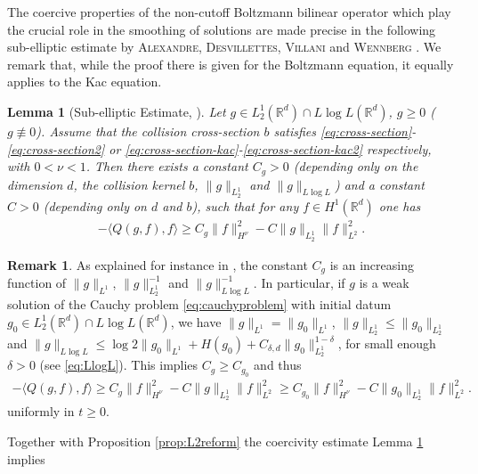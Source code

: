 \documentclass[11pt,a4paper,reqno]{amsart}
\theoremstyle{plain}
\newtheorem{lemma}[proposition]{Lemma}
\theoremstyle{definition}
\newtheorem{remark}[proposition]{Remark}
\begin{document}
The coercive properties of the non-cutoff Boltzmann bilinear operator which play the crucial role in the smoothing of solutions are made precise in the following sub-elliptic estimate by \textsc{Alexandre, Desvillettes, Villani} and \textsc{Wennberg} \cite{ADVW00}. We remark that, while the proof there is given for the Boltzmann equation, it equally applies to the Kac equation.

\begin{lemma}[Sub-elliptic Estimate, \cite{ADVW00}]\label{lem:subelliptic}
	Let $g\in L^1_2({\mathbb{R}}^d) \cap L\log L({\mathbb{R}}^d)$, $g\geq 0$ ($g\not\equiv 0$). Assume that the collision cross-section $b$ satisfies \eqref{eq:cross-section}-\eqref{eq:cross-section2} or \eqref{eq:cross-section-kac}-\eqref{eq:cross-section-kac2} respectively, with $0<\nu<1$. Then there exists a constant $C_g>0$ (depending only on the dimension $d$, the collision kernel $b$, $\|g\|_{L^1_2}$ and $\|g\|_{L\log L}$) and a constant $C>0$ (depending only on $d$ and $b$), such that for any $f\in H^1({\mathbb{R}}^d)$ one has
	\begin{align*}
		-\langle Q(g,f), f\rangle \geq C_g \|f\|_{H^{\nu}}^2 - C \|g\|_{L^1_2} \|f\|_{L^2}^2.
	\end{align*}
\end{lemma}

\begin{remark} As explained for instance in \cite{AMUXY10}, the constant $C_g$ is an increasing function of $\|g\|_{L^1}$, $\|g\|_{L^1_2}^{-1}$ and $\|g\|_{L\log L}^{-1}$. In particular, if $g$ is a weak solution of the Cauchy problem \eqref{eq:cauchyproblem} with initial datum $g_0\in L^1_2({\mathbb{R}}^d)\cap L\log L({\mathbb{R}}^d)$, we have $\|g\|_{L^1}=\|g_0\|_{L^1}$, $\|g\|_{L^1_2} \leq \|g_0\|_{L^1_2}$ and $\|g\|_{L\log L} \leq \log2 \|g_0\|_{L^1} + H(g_0) + C_{\delta,d} \|g_0\|_{L^1_2}^{1-\delta}$, for small enough $\delta>0$ (see \eqref{eq:LlogL}). This implies $C_g \geq C_{g_0}$ and thus
			\begin{align*}
				-\langle Q(g,f), f\rangle \geq C_g \|f\|_{H^{\nu}}^2 - C \|g\|_{L^1_2} \|f\|_{L^2}^2 \geq C_{g_0} \|f\|_{H^{\nu}}^2 - C \|g_0\|_{L^1_2} \|f\|_{L^2}^2.
			\end{align*}
		uniformly in $t\ge 0$.
\end{remark}

Together with Proposition \ref{prop:L2reform} the coercivity estimate Lemma \ref{lem:subelliptic} implies
\end{document}
